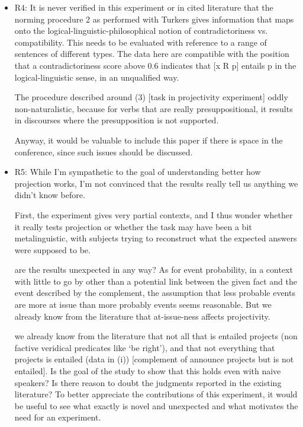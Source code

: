 \documentclass[11pt,fleqn]{article}
\newcommand{\6}{\mbox{$[\hspace*{-.6mm}[$}}
\newcommand{\9}{\mbox{$]\hspace*{-.6mm}]$}}
\begin{document}
{\begin{itemize}
The authors suggest a correlation between at-issueness (which has been argued to be involved in projection) and probability, but then doesn't it make more sense to investigate at-issueness directly rather than event probability? Of course, it is conceivable that probability is easier to study and can serve as a proxy for at-issueness, but then this should be made explicit, and the choice should be accompanied with an explanation of why studying the proxy (rather than the actual entity of interest) is still meaningful.

\item R4: It is never verified in this experiment or in cited literature that the norming procedure 2 as performed with Turkers gives information that maps onto the logical-linguistic-philosophical notion of contradictoriness vs. compatibility.  This needs to be evaluated with reference to a range of sentences of different types.  The data here are compatible with the position that a contradictoriness score above 0.6 indicates that [x R p] entails p in the logical-linguistic sense, in an unqualified way.

The procedure described around (3) [task in projectivity experiment] oddly non-naturalistic, because for verbs that are really presuppositional, it results in discourses where the presupposition is not supported.

Anyway, it would be valuable to include this paper if there is space in the conference, since such issues should be discussed.

\item R5: While I’m sympathetic to the goal of understanding better how projection works, I’m not convinced that the results really tell us anything we didn’t know before.

First, the experiment gives very partial contexts, and I thus wonder whether it really tests projection or whether the task may have been a bit metalinguistic, with subjects trying to reconstruct what the expected answers were supposed to be.

are the results unexpected in any way? As for event probability, in a context with little to go by other than a potential link between the given fact and the event described by the complement, the assumption that less probable events are more at issue than more probably events seems reasonable. But we already know from the literature that at-issue-ness affects projectivity.

we already know from the literature that not all that is entailed projects (non factive veridical predicates like ‘be right’), and that not everything that projects is entailed (data in (i)) [complement of announce projects but is not entailed]. Is the goal of the study to show that this holds even with naive speakers? Is there reason to doubt the judgments reported in the existing literature? To better appreciate the contributions of this experiment, it would be useful to see what exactly is novel and unexpected and what motivates the need for an experiment.


\end{itemize}}
\end{document}
